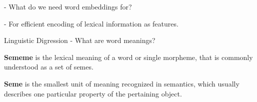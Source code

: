 \documentclass{beamer}
\begin{document}
    \begin{frame}{\insertsection}
      - What do we need word embeddings for?

      - For efficient encoding of lexical information as features.
    \end{frame}

    \begin{frame}{Linguistic Digression}
      - What are word meanings?

      \begin{definition}
        \textbf{Sememe} is the lexical meaning of a word or single morpheme,
        that is commonly understood as a set of semes.\cite{Bussmann:02}
      \end{definition}

      \begin{definition}
        \textbf{Seme} is the smallest unit of meaning recognized in semantics,
        which usually describes one particular property of the pertaining
        object.\cite{Wiki:Seme}
      \end{definition}
    \end{frame}
\end{document}
